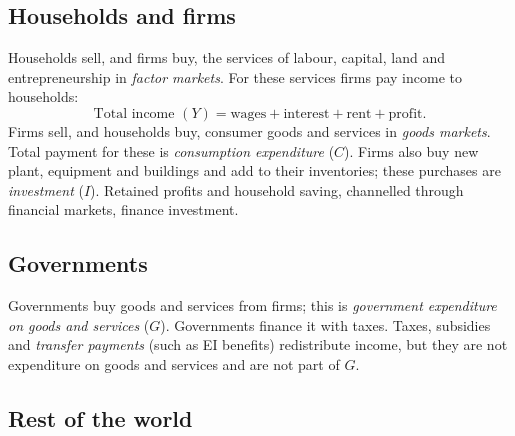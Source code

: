 \begin{center}
\end{center}

\subsection{Households and firms}

Households sell, and firms buy, the services of labour, capital, land and
entrepreneurship in \emph{factor markets}. For these services firms pay income to
households:
\[
  \text{Total income } (Y) = \text{wages} + \text{interest} + \text{rent} + \text{profit}.
\]
Firms sell, and households buy, consumer goods and services in \emph{goods markets}.
Total payment for these is \emph{consumption expenditure} ($C$). Firms also buy new
plant, equipment and buildings and add to their inventories; these purchases are
\emph{investment} ($I$). Retained profits and household saving, channelled through
financial markets, finance investment.

\subsection{Governments}

Governments buy goods and services from firms; this is \emph{government expenditure on
goods and services} ($G$). Governments finance it with taxes. Taxes, subsidies and
\emph{transfer payments} (such as EI benefits) redistribute income, but they are not
expenditure on goods and services and are not part of $G$.

\subsection{Rest of the world}

